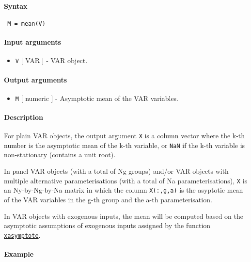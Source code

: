


	\paragraph{Syntax}
 
 \begin{verbatim}
 M = mean(V)
 \end{verbatim}
 
 \paragraph{Input arguments}
 
 \begin{itemize}
 \item
   \texttt{V} {[} VAR {]} - VAR object.
 \end{itemize}
 
 \paragraph{Output arguments}
 
 \begin{itemize}
 \item
   \texttt{M} {[} numeric {]} - Asymptotic mean of the VAR variables.
 \end{itemize}
 
 \paragraph{Description}
 
 For plain VAR objects, the output argument \texttt{X} is a column vector
 where the k-th number is the asymptotic mean of the k-th variable, or
 \texttt{NaN} if the k-th variable is non-stationary (contains a unit
 root).
 
 In panel VAR objects (with a total of Ng groups) and/or VAR objects with
 multiple alternative parameterisations (with a total of Na
 parameterisations), \texttt{X} is an Ny-by-Ng-by-Na matrix in which the
 column \texttt{X(:,g,a)} is the asyptotic mean of the VAR variables in
 the g-th group and the a-th parameterisation.
 
 In VAR objects with exogenous inputs, the mean will be computed based on
 the asymptotic assumptions of exogenous inputs assigned by the function
 \href{VAR/xasymptote}{\texttt{xasymptote}}.
 
 \paragraph{Example}



